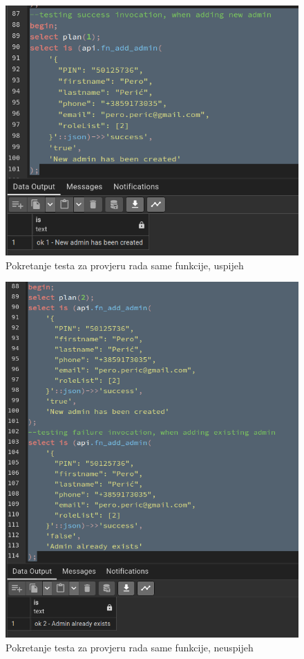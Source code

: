 				\begin{figure}[H]
					\centering
					\includegraphics[width=\textwidth]{slike/unit_tests/ut_2/success_invocation.png}
					\caption{Pokretanje testa za provjeru rada same funkcije, uspijeh}
					\label{fig: IS2-uspješno kreiran administrator}
				\end{figure}
				\begin{figure}[H]
					\centering
					\includegraphics[width=\textwidth]{slike/unit_tests/ut_2/failure_invocation.png}
					\caption{Pokretanje testa za provjeru rada same funkcije, neuspijeh}
					\label{fig: IS2-administrator nije kreiran, već postoji isti}
				\end{figure}
